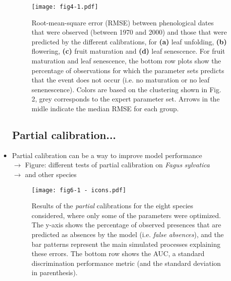 \documentclass[letterpaper,8pt]{extarticle}  %
\begin{document}
\begin{doublespacing}
\begin{linenumbers}
\begin{itemize}
\begin{figure}[htpb]
\hspace*{-1cm}
\centering
\begin{subcaptiongroup}
\label{fig:3A} 
\label{fig:3B}
\label{fig:3C}
\label{fig:3D}
\label{fig:3E}
\end{subcaptiongroup}
\texttt{[image: fig4-1.pdf]}
\caption{Root-mean-square error (RMSE) between phenological dates that were observed (between 1970 and 2000) and those that were predicted by the different calibrations, for \textbf{(a)} leaf unfolding, \textbf{(b)} flowering, \textbf{(c)} fruit maturation and \textbf{(d)} leaf senescence. For fruit maturation and leaf senescence, the bottom row plots show the percentage of observations for which the parameter sets predicts that the event does not occur (i.e. no maturation or no leaf senenescence). Colors are based on the clustering shown in Fig. 2, grey corresponds to the expert parameter set. Arrows in the midle indicate the median RMSE for each group.}
\label{fig:3}
\end{figure}

\subsection{Partial calibration...}

\item Partial calibration can be a way to improve model performance \\
$\rightarrow$ Figure: different tests of partial calibration on \emph{Fagus sylvatica} \\
$\rightarrow$ and other species


\begin{figure}[htpb]
\hspace*{-0.5cm}
\centering
\texttt{[image: fig6-1 - icons.pdf]}
\caption{Results of the \emph{partial} calibrations for the eight species considered, where only some of the parameters were optimized. The y-axis shows the percentage of observed presences that are predicted as absences by the model (i.e. \emph{false absences}), and the bar patterns represent the main simulated processes explaining these errors. The bottom row shows the AUC, a standard discrimination performance metric (and the standard deviation in parenthesis).  }
\label{fig:4}
\end{figure}


\end{itemize}
\end{linenumbers}
\end{doublespacing}
\end{document}
